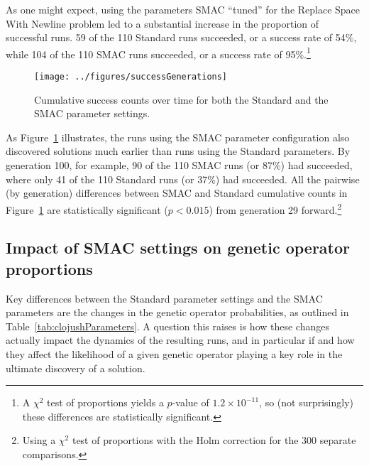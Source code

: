 As one might expect, using the parameters SMAC ``tuned'' for the
Replace Space With Newline problem led to a 
substantial increase in the proportion of successful runs. 59 of 
the 110 Standard runs succeeded, or a success rate of 54\%, while 104 of the
110 SMAC runs succeeded, or a success rate of 95\%.\footnote{A $\chi^2$ test of 
proportions yields a $p$-value of $1.2 \times 10^{-11}$, so (not surprisingly)
these differences are statistically significant.}

\begin{figure}
	\texttt{[image: ../figures/successGenerations]}
	\caption{Cumulative success counts over time for both the Standard
	and the SMAC parameter settings.}
	\label{fig:successGenerations}
\end{figure}

As Figure~\ref{fig:successGenerations} illustrates, the runs using the SMAC
parameter configuration also discovered solutions much earlier than runs using
the Standard parameters. By generation 100, for example, 90 of the 110 SMAC 
runs (or 87\%) had succeeded, where only 41 of the 110 Standard runs 
(or 37\%) had succeeded. All the pairwise (by generation) differences 
between SMAC and Standard cumulative counts in 
Figure~\ref{fig:successGenerations} are 
statistically significant ($p<0.015$)
from generation 29 forward.\footnote{Using a $\chi^2$ test of proportions 
	with the Holm correction for the 300 separate comparisons.}

\subsection{Impact of SMAC settings on genetic operator proportions}
\label{sec:SMACimpactRSWNops}

Key differences between the Standard parameter settings and the SMAC parameters
are the changes in the genetic operator probabilities, as outlined in
Table~\ref{tab:clojushParameters}. 
A question this raises is how these changes
actually impact the dynamics of the resulting runs, and in particular if and
how they affect the likelihood of a given genetic operator playing a key
role in the ultimate discovery of a solution.


